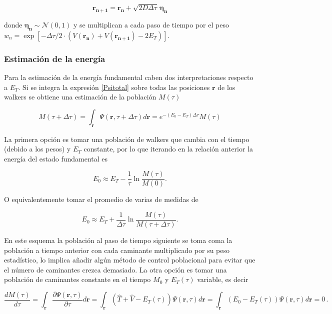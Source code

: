\documentclass[11pt,a4paper,twoside,pdf]{article}
\numberwithin{equation}{section}
\begin{document}
\begin{equation}
    \mathbf{r_{n+1}} = \mathbf{r_n} + \sqrt{2D\Delta \tau}  \, \boldsymbol{\eta_n}
\label{langevindmcpuro}
\end{equation}
    
    

donde $\boldsymbol{\eta_n} \sim \mathcal{N}(0, 1)$ y se multiplican a cada paso de tiempo por el peso $w_n = \exp \left[ - \Delta \tau / 2 \cdot ( V(\mathbf{r_n}) + V(\mathbf{r_{n+1}})- 2E_T) \right]$.\\



\subsubsection{Estimación de la energía}



Para la estimación de la energía fundamental caben dos interpretaciones respecto a $E_T$. Si se integra la expresión \ref{Psitotal} sobre todas las posiciones $\mathbf{r}$ de los walkers se obtiene una estimación de la población $M(\tau)$

$$
    M(\tau + \Delta \tau) = \int_{\mathbf{r}} \Psi(\mathbf{r}, \tau + \Delta \tau) d\mathbf{r} = e^{-(E_0 - E_T)\Delta \tau} M(\tau)
$$


La primera opción es tomar una población de walkers que cambia con el tiempo (debido a los pesos) y $E_T$ constante, por lo que iterando en la relación anterior la energía del estado fundamental es

$$
    E_0 \approx E_T - \frac{1}{\tau} \ln \frac{M(\tau)}{M(0)}.
$$

O equivalentemente tomar el promedio de varias de medidas de

$$
    E_0 \approx E_T + \frac{1}{\Delta \tau} \ln \frac{M(\tau)}{M(\tau + \Delta \tau)}.
$$

\newpage
En este esquema la población al paso de tiempo siguiente se toma coma la población a tiempo anterior con cada caminante multiplicado por su peso estadístico, lo implica añadir algún método de control poblacional para evitar que el número de caminantes crezca demasiado. La otra opción es tomar una población de caminantes constante en el tiempo $M_0$ y $E_T (\tau)$ variable, es decir

$$
    \frac{d M(\tau)}{d\tau} = \int_{\mathbf{r}} \frac{\partial \Psi (\mathbf{r}, \tau)}{\partial \tau} d\mathbf{r} =  \int_{\mathbf{r}} (\hat{T} + \hat{V} - E_T (\tau)) \Psi (\mathbf{r}, \tau) d\mathbf{r} = \int_{\mathbf{r}} (E_0 - E_T(\tau)) \Psi (\mathbf{r}, \tau) d\mathbf{r} = 0\, .
$$
\end{document}
